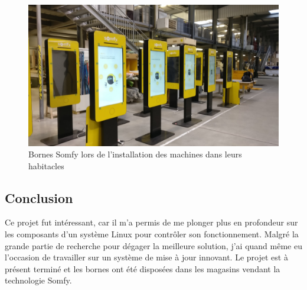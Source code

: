 \begin{figure}[h]
    \centering
    \includegraphics[scale=0.4]{img/somfy-install.jpg}
    \caption{Bornes Somfy lors de l'installation des machines dans leurs habitacles}
\end{figure}

\subsection{Conclusion}

Ce projet fut intéressant, car il m'a permis de me plonger plus en profondeur sur les composants d'un système Linux pour contrôler son fonctionnement.
Malgré la grande partie de recherche pour dégager la meilleure solution, j'ai quand même eu l'occasion de travailler sur un système de mise à jour innovant.
Le projet est à présent terminé et les bornes ont été disposées dans les magasins vendant la technologie Somfy.
